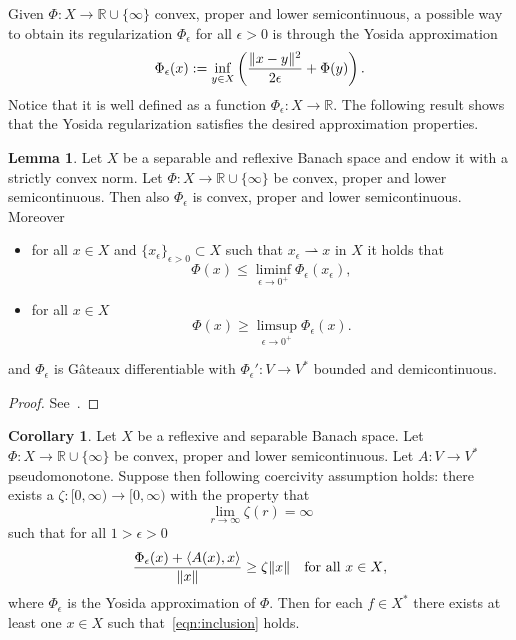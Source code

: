 \documentclass[a4paper,10pt,oneside]{amsbook}
\numberwithin{section}{chapter}
\numberwithin{equation}{chapter}
\theoremstyle{definition}
\newtheorem{cor}[prop]{Corollary}
\newtheorem{lemma}[prop]{Lemma}
\newtheorem{rmk}[prop]{Remark}
\DeclarePairedDelimiter{\norm}{\lVert}{\rVert}
\DeclarePairedDelimiter{\dual}{\langle}{\rangle}
\begin{document}
Given $\Phi\colon X\to\mathbb{R}\cup\{\infty\}$ convex, proper and lower semicontinuous, a possible way to obtain its regularization $\Phi_\epsilon$ for all $\epsilon>0$ is through the Yosida approximation
\[
\Phi_\epsilon(x):=\inf_{y\in X}\left(\frac{\norm{x-y}^2}{2\epsilon}+\Phi(y)\right).
\]
Notice that it is well defined as a function $\Phi_\epsilon\colon X\to\mathbb{R}$. The following result shows that the Yosida regularization satisfies the desired approximation properties.
\begin{lemma}
\label{lemma:yosida}
Let $X$ be a separable and reflexive Banach space and endow it with a strictly convex norm. Let $\Phi\colon X\to\mathbb{R}\cup\{\infty\}$ be convex, proper and lower semicontinuous. Then also $\Phi_\epsilon$ is convex, proper and lower semicontinuous. Moreover
\begin{itemize}
\item[(i)] for all $x\in X$ and $\{x_\epsilon\}_{\epsilon>0}\subset X$ such that $x_\epsilon\rightharpoonup x$ in $X$ it holds that
\[
\Phi(x)\le\liminf_{\epsilon\to0^+}\Phi_\epsilon(x_\epsilon),
\]
\item[(ii)] for all $x\in X$
\[
\Phi(x)\ge\limsup_{\epsilon\to 0^+}\Phi_\epsilon(x).
\]
\end{itemize}
and $\Phi_\epsilon$ is G\^ateaux differentiable with $\Phi_\epsilon'\colon V\to V^*$ bounded and demicontinuous.
\end{lemma}
\begin{proof}
See~\cite[Lemma 5.17]{roubicek-pde}.
\end{proof}
\begin{cor}
\label{cor:corollary-5-19}
Let $X$ be a reflexive and separable Banach space. Let $\Phi\colon X\to\mathbb{R}\cup\{\infty\}$ be convex, proper and lower semicontinuous. Let $A\colon V\to V^*$ pseudomonotone. Suppose then following coercivity assumption holds: there exists a $\zeta\colon[0,\infty)\to[0,\infty)$ with the property that
\[
\lim_{r\to\infty}\zeta(r)=\infty
\]
such that for all $1>\epsilon>0$
\[
\frac{\Phi_\epsilon(x)+\dual{A(x),x}}{\norm{x}}\ge\zeta{\norm{x}}\quad\text{for all $x\in X$},
\]
where $\Phi_\epsilon$ is the Yosida approximation of $\Phi$. Then for each $f\in X^*$ there exists at least one $x\in X$ such that~\eqref{eqn:inclusion} holds.
\end{cor}
\end{document}
